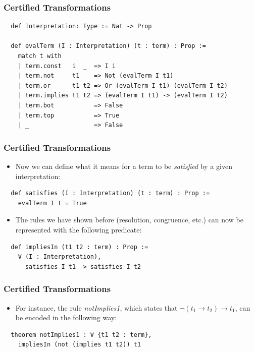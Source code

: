 \documentclass[usepdftitle=false,aspectratio=169,usenames,dvipsnames]{beamer}
\begin{document}
\begin{frame}[fragile]
  \frametitle{Certified Transformations}
  \begin{verbatim}
  def Interpretation: Type := Nat -> Prop

  def evalTerm (I : Interpretation) (t : term) : Prop :=
    match t with
    | term.const   i  _  => I i
    | term.not     t1    => Not (evalTerm I t1)
    | term.or      t1 t2 => Or (evalTerm I t1) (evalTerm I t2)
    | term.implies t1 t2 => (evalTerm I t1) -> (evalTerm I t2)
    | term.bot           => False
    | term.top           => True
    | _                  => False
  \end{verbatim}
\end{frame}

\begin{frame}[fragile]
  \frametitle{Certified Transformations}
  \begin{itemize}
    \item Now we can define what it means for a term to be \textit{satisfied} by a given interpretation:
  \end{itemize}
  \vfill
  \begin{verbatim}
  def satisfies (I : Interpretation) (t : term) : Prop :=
    evalTerm I t = True
  \end{verbatim}
  \vfill
  \begin{itemize}
    \item The rules we have shown before (resolution, congruence, etc.) can now be represented with the following predicate:
  \end{itemize}
  \vfill
  \begin{verbatim}
  def impliesIn (t1 t2 : term) : Prop :=
    ∀ (I : Interpretation),
      satisfies I t1 -> satisfies I t2
  \end{verbatim}
\end{frame}

\begin{frame}[fragile]
  \frametitle{Certified Transformations}
  \begin{itemize}
    \item For instance, the rule \textit{notImplies1}, which states that $\neg (t_{1} \rightarrow t_{2}) \rightarrow t_{1}$, can be encoded in the following way:
  \end{itemize}
  \vfill
  \begin{verbatim}
  theorem notImplies1 : ∀ {t1 t2 : term},
    impliesIn (not (implies t1 t2)) t1
  \end{verbatim}
\end{frame}
\end{document}
